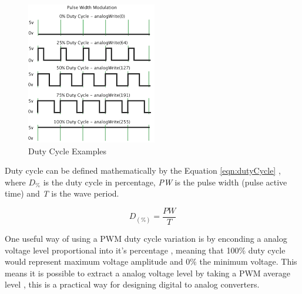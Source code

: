 	\begin{figure}[htbp]
		\centering
			\includegraphics[width=.8\textwidth]{figuras/fig-dutyCycle}
		\caption{Duty Cycle Examples \cite{fig-dutyCycle}}
		\label{fig:dutyCycle}
	\end{figure}

	Duty cycle can be defined mathematically by the Equation \ref{eqn:dutyCycle} \cite{james2001fundamentals}, where \textit{$D_{\%}$} is the duty cycle in percentage, \textit{PW} is the pulse width (pulse active time) and \textit{T} is the wave period. 

	\begin{equation}\label{eqn:dutyCycle}
		D_{ \left( \% \right) } =\frac{PW}{T}
	\end{equation}

	One useful way of using a PWM duty cycle variation is by enconding a analog voltage level proportional into it's percentage \cite{holmes2003pulse}, meaning that 100$\%$ duty cycle would represent maximum voltage amplitude and 0$\%$ the minimum voltage. This means it is possible to extract a analog voltage level by taking a PWM average level \cite{alter2008pwm}, this is a practical way for designing digital to analog converters.


